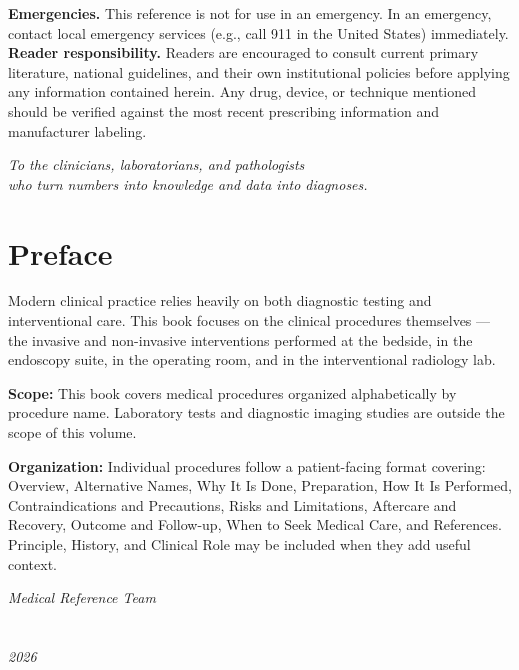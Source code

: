 \documentclass[12pt,oneside]{book}
\begin{document}
\noindent\textbf{Emergencies.} This reference is not for use in an emergency. In an emergency, contact local emergency services (e.g., call 911 in the United States) immediately.\\[0.3cm]

\noindent\textbf{Reader responsibility.} Readers are encouraged to consult current primary literature, national guidelines, and their own institutional policies before applying any information contained herein. Any drug, device, or technique mentioned should be verified against the most recent prescribing information and manufacturer labeling.

\newpage
\thispagestyle{empty}
\vspace*{\fill}
\begin{center}
    \textit{To the clinicians, laboratorians, and pathologists\\
    who turn numbers into knowledge and data into diagnoses.}
\end{center}
\vspace*{\fill}

\chapter*{Preface}

Modern clinical practice relies heavily on both diagnostic testing and interventional care. This book focuses on the clinical procedures themselves --- the invasive and non-invasive interventions performed at the bedside, in the endoscopy suite, in the operating room, and in the interventional radiology lab.

\textbf{Scope:} This book covers medical procedures organized alphabetically by procedure name. Laboratory tests and diagnostic imaging studies are outside the scope of this volume.

\textbf{Organization:} Individual procedures follow a patient-facing format covering: Overview, Alternative Names, Why It Is Done, Preparation, How It Is Performed, Contraindications and Precautions, Risks and Limitations, Aftercare and Recovery, Outcome and Follow-up, When to Seek Medical Care, and References. Principle, History, and Clinical Role may be included when they add useful context.

\vspace{1cm}
\noindent \textit{Medical Reference Team}\\\\\\\textit{2026}
\end{document}
